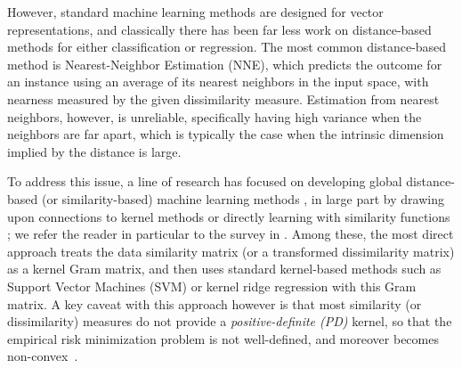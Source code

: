 \documentclass{article}
\newcommand{\1}{\mathbf{1}}
\begin{document}
However, standard machine learning methods are designed for vector representations, and classically there has been far less work on distance-based methods for either classification or regression. The most common distance-based method is Nearest-Neighbor Estimation (NNE), which predicts the outcome for an instance using an average of its nearest neighbors in the input space, with nearness measured by the given dissimilarity measure. Estimation from nearest neighbors, however, is unreliable, specifically having high variance when the neighbors are far apart, which is typically the case when the intrinsic dimension implied by the distance is large.

To address this issue, a line of research has focused on developing global distance-based (or similarity-based) machine learning methods \cite{pkkalska2005dissimilarity,duin2012dissimilarity,balcan2008theory,cortes2012algorithms}, in large part by drawing upon connections to kernel methods \cite{scholkopf1999input} or directly learning with similarity functions \cite{balcan2008theory,cortes2012algorithms,balcan2008discriminative}; we refer the reader in particular to the survey in \cite{chen2009similarity}. Among these, the most direct approach treats the data similarity matrix (or a transformed dissimilarity matrix) as a kernel Gram matrix, and then uses standard kernel-based methods such as Support Vector Machines (SVM) or kernel ridge regression with this Gram matrix. A key caveat with this approach however is that most similarity (or dissimilarity) measures do not provide a \emph{positive-definite (PD)} kernel, so that the empirical risk minimization problem is not well-defined, and moreover becomes non-convex~\cite{ong2004learning,lin2003study}. 
\end{document}
